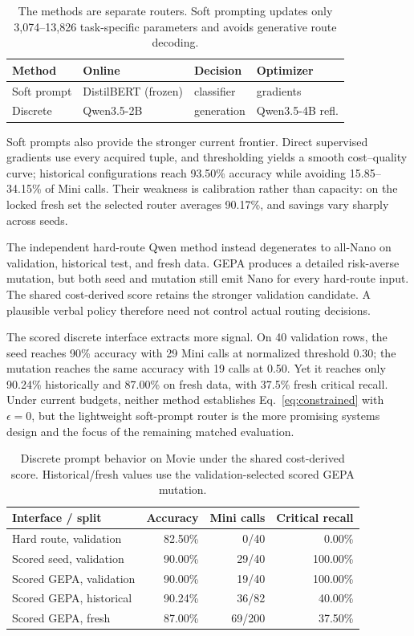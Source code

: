 \begin{table}[t]
  \centering
  \small
  \caption{The methods are separate routers. Soft prompting updates only
  3,074--13,826 task-specific parameters and avoids generative route decoding.}
  \label{tab:router-resources}
  \begin{tabular}{@{}llll@{}}
    \toprule
    Method & Online & Decision & Optimizer\\
    \midrule
    Soft prompt & DistilBERT (frozen) & classifier & gradients\\
    Discrete & Qwen3.5-2B & generation & Qwen3.5-4B refl.\\
    \bottomrule
  \end{tabular}
\end{table}

Soft prompts also provide the stronger current frontier. Direct supervised
gradients use every acquired tuple, and thresholding yields a smooth
cost--quality curve; historical configurations reach 93.50\% accuracy while
avoiding 15.85--34.15\% of Mini calls. Their weakness is calibration rather
than capacity: on the locked fresh set the selected router averages 90.17\%,
and savings vary sharply across seeds.

The independent hard-route Qwen method instead degenerates to all-Nano on
validation, historical test, and fresh data. GEPA produces a detailed
risk-averse mutation, but both seed and mutation still emit Nano for every
hard-route input. The shared cost-derived score retains the stronger validation candidate. A
plausible verbal policy therefore need not control actual routing decisions.

The scored discrete interface extracts more signal. On 40 validation rows, the
seed reaches 90\% accuracy with 29 Mini calls at normalized threshold 0.30;
the mutation reaches the same accuracy with 19 calls at 0.50. Yet it reaches
only 90.24\% historically and 87.00\% on fresh data, with 37.5\% fresh
critical recall. Under current budgets, neither method establishes
Eq.~\ref{eq:constrained} with $\epsilon=0$, but the lightweight soft-prompt
router is the more promising systems design and the focus of the remaining
matched evaluation.

\begin{table}[t]
  \centering
  \small
  \caption{Discrete prompt behavior on Movie under the shared cost-derived score. Historical/fresh values use the
  validation-selected scored GEPA mutation.}
  \label{tab:gepa}
  \begin{tabular}{lrrr}
    \toprule
    Interface / split & Accuracy & Mini calls & Critical recall\\
    \midrule
    Hard route, validation & 82.50\% & 0/40 & 0.00\%\\
    Scored seed, validation & 90.00\% & 29/40 & 100.00\%\\
    Scored GEPA, validation & 90.00\% & 19/40 & 100.00\%\\
    Scored GEPA, historical & 90.24\% & 36/82 & 40.00\%\\
    Scored GEPA, fresh & 87.00\% & 69/200 & 37.50\%\\
    \bottomrule
  \end{tabular}
\end{table}
